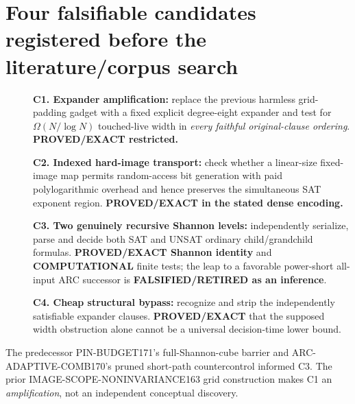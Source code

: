 \documentclass[11pt]{article}
\begin{document}
\section*{Four falsifiable candidates registered before the literature/corpus search}
\begin{description}
\item[] \textbf{C1. Expander amplification:} replace the previous harmless grid-padding gadget with a fixed explicit degree-eight expander and test for $\Omega(N/\log N)$ touched-live width in \emph{every faithful original-clause ordering}. \textbf{PROVED/EXACT restricted.}
\item[] \textbf{C2. Indexed hard-image transport:} check whether a linear-size fixed-image map permits random-access bit generation with paid polylogarithmic overhead and hence preserves the simultaneous SAT exponent region. \textbf{PROVED/EXACT in the stated dense encoding.}
\item[] \textbf{C3. Two genuinely recursive Shannon levels:} independently serialize, parse and decide both SAT and UNSAT ordinary child/grandchild formulas. \textbf{PROVED/EXACT Shannon identity} and \textbf{COMPUTATIONAL} finite tests; the leap to a favorable power-short all-input ARC successor is \textbf{FALSIFIED/RETIRED as an inference}.
\item[] \textbf{C4. Cheap structural bypass:} recognize and strip the independently satisfiable expander clauses. \textbf{PROVED/EXACT} that the supposed width obstruction alone cannot be a universal decision-time lower bound.
\end{description}
The predecessor PIN-BUDGET171's full-Shannon-cube barrier and ARC-ADAPTIVE-COMB170's pruned short-path countercontrol informed C3. The prior IMAGE-SCOPE-NONINVARIANCE163 grid construction makes C1 an \emph{amplification}, not an independent conceptual discovery.
\end{document}
